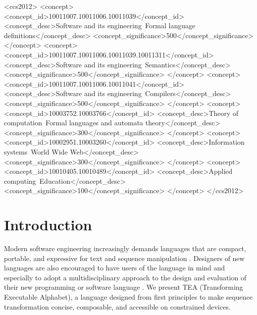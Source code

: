 \documentclass[acmtoplas]{acmart}
\begin{document}
\begin{CCSXML}
<ccs2012>
   <concept>
       <concept_id>10011007.10011006.10011039</concept_id>
       <concept_desc>Software and its engineering~Formal language definitions</concept_desc>
       <concept_significance>500</concept_significance>
       </concept>
   <concept>
       <concept_id>10011007.10011006.10011039.10011311</concept_id>
       <concept_desc>Software and its engineering~Semantics</concept_desc>
       <concept_significance>500</concept_significance>
       </concept>
   <concept>
       <concept_id>10011007.10011006.10011041</concept_id>
       <concept_desc>Software and its engineering~Compilers</concept_desc>
       <concept_significance>500</concept_significance>
       </concept>
   <concept>
       <concept_id>10003752.10003766</concept_id>
       <concept_desc>Theory of computation~Formal languages and automata theory</concept_desc>
       <concept_significance>300</concept_significance>
       </concept>
   <concept>
       <concept_id>10002951.10003260</concept_id>
       <concept_desc>Information systems~World Wide Web</concept_desc>
       <concept_significance>300</concept_significance>
       </concept>
   <concept>
       <concept_id>10010405.10010489</concept_id>
       <concept_desc>Applied computing~Education</concept_desc>
       <concept_significance>100</concept_significance>
       </concept>
 </ccs2012>
\end{CCSXML}



\maketitle

\section{Introduction}
\label{SEC1}


Modern software engineering increasingly demands languages that are compact, portable, and expressive for text and sequence manipulation \cite{lutalo2024software}. Designers of new languages are also encouraged to have users of the language in mind and especially to adopt a multidisciplinary approach to the design and evaluation of their new programming or software language \cite{coblenz2018interdisciplinary}. We present TEA (Transforming Executable Alphabet), a language designed from first principles to make sequence transformation concise, composable, and accessible on constrained devices.
\end{document}
